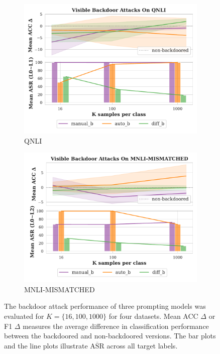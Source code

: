 \begin{figure}[!ht]
\begin{subfigure}{.5\textwidth}
  \includegraphics[width=\linewidth]{figures/evaluation_media/QNLI_score_n_attack.pdf}
  \caption{QNLI}
  \label{fig:qnli}
\end{subfigure}%
\begin{subfigure}{.5\textwidth}
  \centering
  \includegraphics[width=\linewidth]{figures/evaluation_media/MNLI-MISMATCHED_score_n_attack.pdf}
  \caption{MNLI-MISMATCHED}
  \label{fig:mismatched}
\end{subfigure}
\caption{The backdoor attack performance of three prompting models was evaluated for $K = \{16,100,1000\}$ for four datasets. Mean ACC $\Delta$ or F1 $\Delta$ measures the average difference in classification performance between the backdoored and non-backdoored versions. The bar plots and the line plots illustrate $\overline{\text{ASR}}$ across all target labels.}
\label{fig:score_n_attack}
\end{figure}

